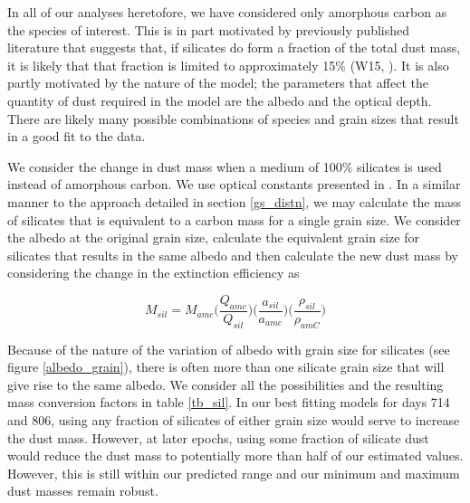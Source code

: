 In all of our analyses heretofore, we have considered only amorphous carbon as the species of interest.  This is in part motivated by previously published literature that suggests that, if silicates do form a fraction of the total dust mass, it is likely that that fraction is limited to approximately 15\% (W15, \citet{Ercolano2007}).  It is also partly motivated by the nature of the model; the parameters that affect the quantity of dust required in the model are the albedo and the optical depth.  There are likely many possible combinations of species and grain sizes that result in a good fit to the data.  

We consider the change in dust mass when a medium of 100\% silicates is used instead of amorphous carbon.  We use optical constants presented in \cite{Draine1984}.  In a similar manner to the approach detailed in section \ref{gs_distn}, we may calculate the mass of silicates that is equivalent to a carbon mass for a single grain size.  We consider the albedo at the original grain size, calculate the equivalent grain size for silicates that results in the same albedo and then calculate the new dust mass by considering the change in the extinction efficiency as

\begin{equation}
M_{sil} = M_{amc} \Big( \frac{Q_{amc}}{Q_{sil}} \Big) \Big(\frac{a_{sil}}{a_{amc}}\Big) \Big(\frac{\rho_{sil}}{\rho_{amC}}\Big)
\end{equation}

Because of the nature of the variation of albedo with grain size for silicates (see figure \ref{albedo_grain}), there is often more than one silicate grain size that will give rise to the same albedo.  We consider all the possibilities and the resulting mass conversion factors in table \ref{tb_sil}.  In our best fitting models for days 714 and 806, using any fraction of silicates of either grain size would serve to increase the dust mass.  However, at later epochs, using some fraction of silicate dust would reduce the dust mass to potentially more than half of our estimated values. However, this is still within our predicted range and our minimum and maximum dust masses remain robust.

